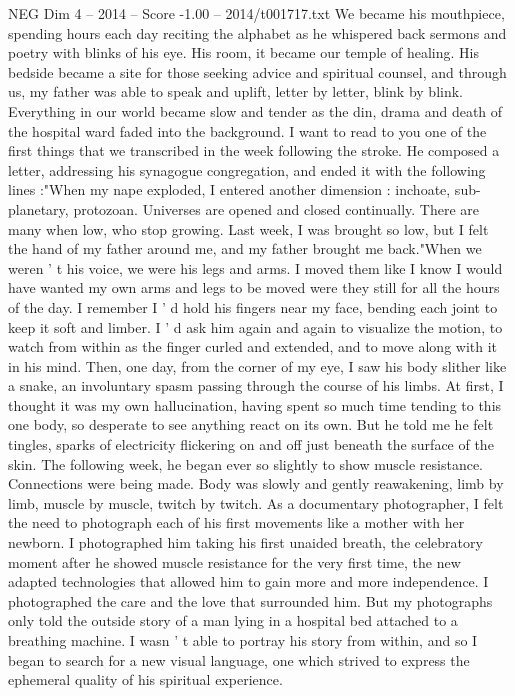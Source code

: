 \begin{textsample}{NEG Dim 4 – 2014 – Score -1.00 – 2014/t001717.txt}
We became his mouthpiece, spending hours each day reciting the alphabet as he whispered back sermons and poetry with blinks of his eye.
His room, it became our temple of healing.
His bedside became a site for those seeking advice and spiritual counsel, and through us, my father was able to speak and uplift, letter by letter, blink by blink.
Everything in our world became slow and tender as the din, drama and death of the hospital ward faded into the background.
I want to read to you one of the first things that we transcribed in the week following the stroke.
He composed a letter, addressing his synagogue congregation, and ended it with the following lines :"When my nape exploded, I entered another dimension : inchoate, sub-planetary, protozoan.
Universes are opened and closed continually.
There are many when low, who stop growing.
Last week, I was brought so low, but I felt the hand of my father around me, and my father brought me back."When we weren ' t his voice, we were his legs and arms.
I moved them like I know I would have wanted my own arms and legs to be moved were they still for all the hours of the day.
I remember I ' d hold his fingers near my face, bending each joint to keep it soft and limber.
I ' d ask him again and again to visualize the motion, to watch from within as the finger curled and extended, and to move along with it in his mind.
Then, one day, from the corner of my eye, I saw his body slither like a snake, an involuntary spasm passing through the course of his limbs.
At first, I thought it was my own hallucination, having spent so much time tending to this one body, so desperate to see anything react on its own.
But he told me he felt tingles, sparks of electricity flickering on and off just beneath the surface of the skin.
The following week, he began ever so slightly to show muscle resistance.
Connections were being made.
Body was slowly and gently reawakening, limb by limb, muscle by muscle, twitch by twitch.
As a documentary photographer, I felt the need to photograph each of his first movements like a mother with her newborn.
I photographed him taking his first unaided breath, the celebratory moment after he showed muscle resistance for the very first time, the new adapted technologies that allowed him to gain more and more independence.
I photographed the care and the love that surrounded him.
But my photographs only told the outside story of a man lying in a hospital bed attached to a breathing machine.
I wasn ' t able to portray his story from within, and so I began to search for a new visual language, one which strived to express the ephemeral quality of his spiritual experience.

\end{textsample}
